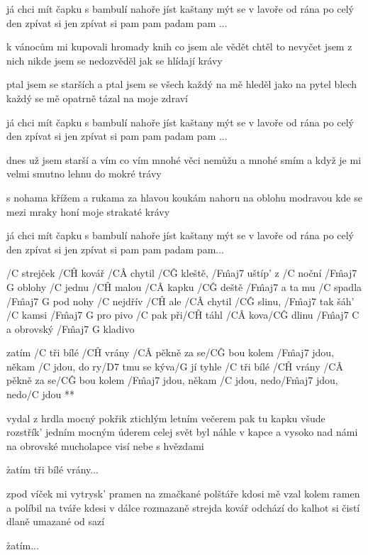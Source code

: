 já chci mít čapku s bambulí nahoře
jíst kaštany mýt se v lavoře
od rána po celý den
zpívat si jen
zpívat si pam pam padam pam ... \s

k vánocům mi kupovali hromady knih
co jsem ale vědět chtěl to nevyčet jsem z nich
nikde jsem se nedozvěděl jak se hlídají krávy \s

ptal jsem se starších a ptal jsem se všech
každý na mě hleděl jako na pytel blech
každý se mě opatrně tázal na moje zdraví \s

já chci mít čapku s bambulí nahoře
jíst kaštany mýt se v lavoře
od rána po celý den
zpívat si jen
zpívat si pam pam padam pam ... \s

dnes už jsem starší a vím co vím
mnohé věci nemůžu a mnohé smím
a když je mi velmi smutno lehnu do mokré trávy \s

s nohama křížem a rukama za hlavou
koukám nahoru na oblohu modravou
kde se mezi mraky honí moje strakaté krávy \s

já chci mít čapku s bambulí nahoře
jíst kaštany mýt se v lavoře
od rána po celý den
zpívat si jen
zpívat si pam pam padam pam...




/C strejček /C\^H kovář /C\^A chytil /C\^G kleště, /F\^{maj7} uštíp' z /C noční /{F\^{maj7} G} oblohy
/C jednu /C\^H malou /C\^A kapku /C\^G deště /F\^{maj7} a ta mu /C spadla /{F\^{maj7} G} pod nohy
/C nejdřív /C\^H ale /C\^A chytil /C\^G slinu, /F\^{maj7} tak šáh' /C kamsi /{F\^{maj7} G} pro pivo
/C pak při/C\^H táhl /C\^A kova/C\^G dlinu /{F\^{maj7} C} a obrovský /{F\^{maj7} G} kladivo

\R  zatím /C tři bílé /C\^H vrány /C\^A pěkně za se/C\^G bou
    kolem /F\^{maj7} jdou, někam /C jdou, do ry/D7 tmu se kýva/G jí
    tyhle /C tři bílé /C\^H vrány /C\^A pěkně za se/C\^G bou
    kolem /F\^{maj7} jdou, někam /C jdou, nedo/F\^{maj7} jdou, nedo/C jdou **

vydal z hrdla mocný pokřik ztichlým letním večerem
pak tu kapku všude rozstřík' jedním mocným úderem
celej svět byl náhle v kapce a vysoko nad námi
na obrovské mucholapce visí nebe s hvězdami

\r zatím tři bílé vrány...

zpod víček mi vytrysk' pramen na zmačkané polštáře
kdosi mě vzal kolem ramen a políbil na tváře
kdesi v dálce rozmazaně strejda kovář odchází
do kalhot si čistí dlaně umazané od sazí

\r zatím...




